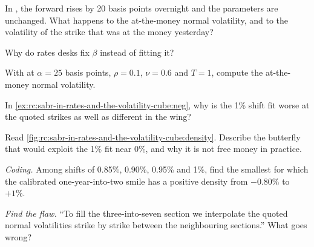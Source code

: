 \begin{exercise}[$\star$]\label{exo:rc:sabr-in-rates-and-the-volatility-cube:2}
In , the forward rises by 20 basis points overnight and the
parameters are unchanged. What happens to the at-the-money normal volatility,
and to the volatility of the strike that was at the money yesterday?
\end{exercise}

\begin{exercise}[$\star$]\label{exo:rc:sabr-in-rates-and-the-volatility-cube:3}
Why do rates desks fix $\beta$ instead of fitting it?
\end{exercise}

\begin{exercise}[$\star\star$]\label{exo:rc:sabr-in-rates-and-the-volatility-cube:4}
With  at $\alpha=25$ basis points, $\rho=0.1$, $\nu=0.6$ and $T=1$,
compute the at-the-money normal volatility.
\end{exercise}

\begin{exercise}[$\star\star$]\label{exo:rc:sabr-in-rates-and-the-volatility-cube:5}
In \cref{ex:rc:sabr-in-rates-and-the-volatility-cube:neg}, why is the 1\% shift
fit worse at the quoted strikes as well as different in the wing?
\end{exercise}

\begin{exercise}[$\star\star$]\label{exo:rc:sabr-in-rates-and-the-volatility-cube:6}
Read \cref{fig:rc:sabr-in-rates-and-the-volatility-cube:density}. Describe the
butterfly that would exploit the 1\% fit near 0\%, and why it is not free money
in practice.
\end{exercise}

\begin{exercise}[$\star\star\star$]\label{exo:rc:sabr-in-rates-and-the-volatility-cube:7}
\emph{Coding.} Among shifts of 0.85\%, 0.90\%, 0.95\% and 1\%, find the smallest
for which the calibrated one-year-into-two smile has a positive density from
$-0.80\%$ to $+1\%$.
\end{exercise}

\begin{exercise}[$\star\star\star$]\label{exo:rc:sabr-in-rates-and-the-volatility-cube:8}
\emph{Find the flaw.} ``To fill the three-into-seven section we interpolate the
quoted normal volatilities strike by strike between the neighbouring sections.''
What goes wrong?
\end{exercise}

